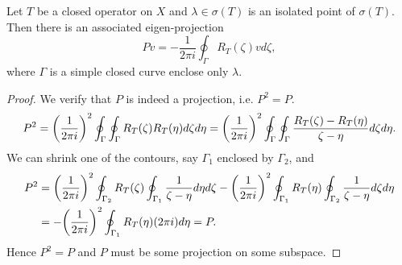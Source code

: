 \begin{theorem}
    Let $T$ be a closed operator on $X$ and $\lambda\in\sigma(T)$ 
    is an isolated point of $\sigma(T)$. Then there is an associated 
    eigen-projection 
    \begin{equation*}
        Pv = -\frac{1}{2\pi i}\oint_{\Gamma} R_T(\zeta)vd\zeta,
    \end{equation*}
    where $\Gamma$ is a simple closed curve enclose only $\lambda$.
\end{theorem}
\begin{proof}
    We verify that $P$ is indeed a projection, i.e. $P^2 = P$. 
    \begin{equation*}
        P^2 = \pth{\frac{1}{2\pi i}}^2\oint_{\Gamma}\oint_{\Gamma} R_T(\zeta)R_T(\eta)d\zeta d\eta 
        = \pth{\frac{1}{2\pi i}}^2\oint_{\Gamma}\oint_{\Gamma} \frac{R_T(\zeta)-R_T(\eta)}{\zeta - \eta}d\zeta d\eta.
    \end{equation*}
    We can shrink one of the contours, say $\Gamma_1$ enclosed by $\Gamma_2$, and 
    \begin{equation*}
        \begin{split}
            P^2 &= \pth{\frac{1}{2\pi i}}^2\oint_{\Gamma_2}R_T(\zeta)\oint_{\Gamma_1} \frac{1}{\zeta - \eta}d\eta d\zeta 
            - \pth{\frac{1}{2\pi i}}^2\oint_{\Gamma_1}R_T(\eta)\oint_{\Gamma_2} \frac{1}{\zeta - \eta}d\zeta d\eta \\
            &= - \pth{\frac{1}{2\pi i}}^2\oint_{\Gamma_1}R_T(\eta)(2\pi i) d\eta = P.
        \end{split}
    \end{equation*}
    Hence $P^2 = P$ and $P$ must be some projection on some subspace. 
\end{proof}
